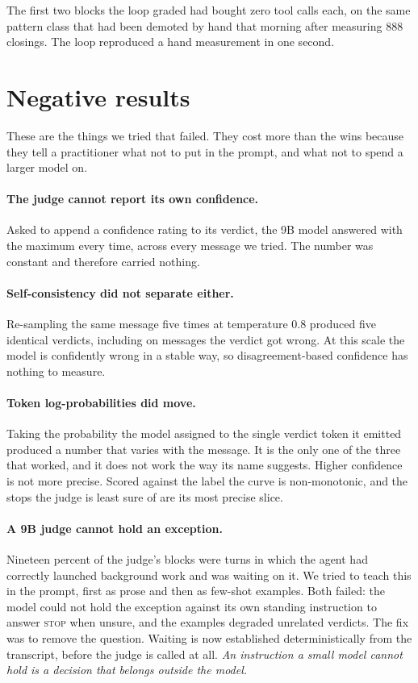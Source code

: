 The first two blocks the loop graded had bought zero tool calls each, on the
same pattern class that had been demoted by hand that morning after measuring
888 closings. The loop reproduced a hand measurement in one second.

\section{Negative results}
\label{sec:negative}

These are the things we tried that failed. They cost more than the wins
because they tell a practitioner what not to put in the prompt, and what
not to spend a larger model on.

\paragraph{The judge cannot report its own confidence.} Asked to append a
confidence rating to its verdict, the 9B model answered with the maximum every
time, across every message we tried. The number was constant and therefore
carried nothing.

\paragraph{Self-consistency did not separate either.} Re-sampling the same
message five times at temperature 0.8 produced five identical verdicts,
including on messages the verdict got wrong. At this scale the model is
confidently wrong in a stable way, so disagreement-based confidence
\cite{wang2022selfconsistency} has nothing to measure.

\paragraph{Token log-probabilities did move.} Taking the probability the model
assigned to the single verdict token it emitted produced a number that varies
with the message. It is the only one of the three that worked, and it does not
work the way its name suggests. Higher confidence is not more precise.
Scored against the label the curve is non-monotonic, and the stops the
judge is least sure of are its most precise slice.

\paragraph{A 9B judge cannot hold an exception.} Nineteen percent of the judge's
blocks were turns in which the agent had correctly launched background work and
was waiting on it. We tried to teach this in the prompt, first as prose and then
as few-shot examples. Both failed: the model could not hold the exception
against its own standing instruction to answer \textsc{stop} when unsure, and
the examples degraded unrelated verdicts. The fix was to remove the question.
Waiting is now established deterministically from the transcript, before the
judge is called at all. \emph{An instruction a small model cannot hold is a
decision that belongs outside the model.}

